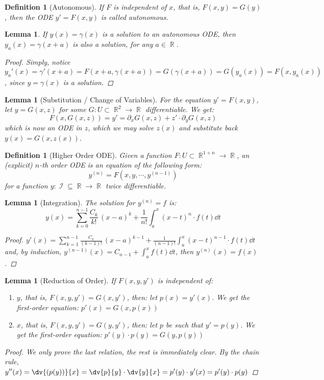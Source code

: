 \documentclass[12pt]{article}
\DeclareMathOperator{\R}{\mathbb{R}}
\DeclareMathOperator{\I}{\mathcal{I}}
\newcommand{\der}[2][n]{{#2}^{(#1)}}
\newcommand*{\pdx}{\partial_x}
\newcommand*{\pdy}{\partial_y}
\newtheorem{definition}[theorem]{Definition}
\newtheorem{lemma}[theorem]{Lemma}
\begin{document}
\begin{definition}[Autonomous]
  If $F$ is independent of $x$, that is, $F(x,y)=G(y)$, then the ODE $y'=F(x,y)$ is called autonomous.
\end{definition}

\begin{lemma}
  If $y(x)=\gamma(x)$ is a solution to an autonomous ODE, then $y_a(x)=\gamma(x+a)$ is also a solution, for any $a\in\R$.
  \begin{proof}
    Simply, notice $y_a'(x)=\gamma'(x+a)=F(x+a,\gamma(x+a))=G(\gamma(x+a))=G(y_a(x))=F(x,y_a(x))$, since $y=\gamma(x)$ is a solution.
  \end{proof}
\end{lemma}

\begin{lemma}[Substitution / Change of Variables]
  \label{change_of_vars}
  For the equation $y'=F(x,y)$, let $y=G(x,z)$ for some $G:U\subset\R^2\to\R$ differentiable. We get: $$F(x,G(x,z))=y'=\pdx G(x,z)+z'\cdot\pdy G(x,z)$$
  which is now an ODE in $z$, which we may solve $z(x)$ and substitute back $y(x)=G(x,z(x))$.
\end{lemma}



\begin{definition}[Higher Order ODE]
  Given a function $F:U\subset \R^{1+n}\to \R$, an (explicit) $n$-th order ODE is an equation of the following form: $$\der{y}=F(x,y,\cdots,\der[n-1]{y})$$ for a function $y:\I\subseteq\R\to\R$ twice differentiable.
\end{definition}

\begin{lemma}[Integration]
  The solution for $\der{y}=f$ is:
  $$y(x)=\sum_{k=0}^{n-1}\frac{C_k}{k!}\,(x-a)^k+\frac{1}{n!}\int_a^x (x-t)^n\cdot f(t)\dd{t}$$
  \begin{proof}
    $\displaystyle y'(x)=\sum_{k=1}^{n-1}\frac{C_k}{(k-1)!}\,(x-a)^{k-1}+\frac{1}{(n-1)!}\int_a^x (x-t)^{n-1}\cdot f(t)\dd{t}$ and, by induction, $\displaystyle \der[n-1]{y}(x)=C_{n-1}+\int_a^x f(t)\dd{t}$, then $\der{y}(x)=f(x)$.
  \end{proof}
\end{lemma}

\begin{lemma}[Reduction of Order]
  If $F(x,y,y')$ is independent of:
  \begin{enumerate}
    \item $y$, that is, $F(x,y,y')=G(x,y')$, then: let $p(x)=y'(x)$. We get the first-order equation: $p'(x)=G(x,p(x))$
    \item $x$, that is, $F(x,y,y')=G(y,y')$, then: let $p$ be such that $y'=p(y)$. We get the first-order equation: $p'(y)\cdot p(y)=G(y,p(y))$
  \end{enumerate}
  \begin{proof}
    We only prove the last relation, the rest is immediately clear. By the chain rule, $\displaystyle y''(x)=\dv{(p(y))}{x}=\dv{p}{y}\cdot\dv{y}{x}=p'(y)\cdot y'(x)=p'(y)\cdot p(y)$
  \end{proof}
\end{lemma}
\end{document}

